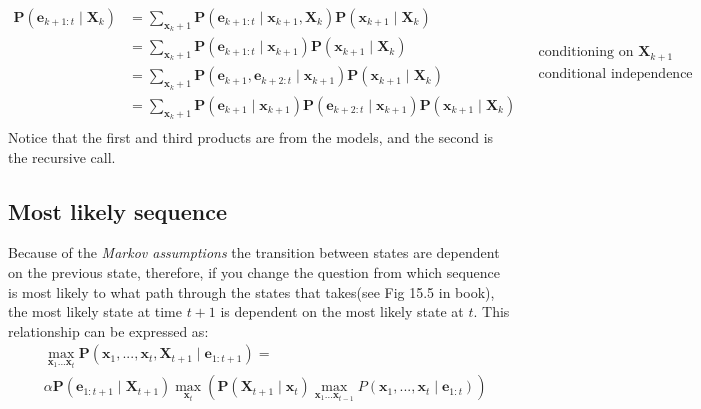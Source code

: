 \documentclass[11pt, letterpaper]{report}
\numberwithin{equation}{section}
\begin{document}
\begin{equation}
  \label{eq:backward}
  \begin{split}
    \boldsymbol{P}(\boldsymbol{e}_{k+1:t} \mid \boldsymbol{X}_k) &=
    \sum_{\boldsymbol{x}_k+1} \boldsymbol{P}(\boldsymbol{e}_{k+1:t} \mid \boldsymbol{x}_{k+1},\boldsymbol{X}_{k})
    \boldsymbol{P}(\boldsymbol{x}_{k+1} \mid \boldsymbol{X}_{k}) \\
    &= \sum_{\boldsymbol{x}_k+1} \boldsymbol{P}(\boldsymbol{e}_{k+1:t} \mid \boldsymbol{x}_{k+1})
    \boldsymbol{P}(\boldsymbol{x}_{k+1} \mid \boldsymbol{X}_{k}) \\
    &= \sum_{\boldsymbol{x}_k+1} \boldsymbol{P}(\boldsymbol{e}_{k+1},\boldsymbol{e}_{k+2:t} \mid
    \boldsymbol{x}_{k+1}) \boldsymbol{P}(\boldsymbol{x}_{k+1} \mid \boldsymbol{X}_{k}) \\
    &= \sum_{\boldsymbol{x}_k+1} \boldsymbol{P}(\boldsymbol{e}_{k+1} \mid
    \boldsymbol{x}_{k+1}) \boldsymbol{P}(\boldsymbol{e}_{k+2:t} \mid
    \boldsymbol{x}_{k+1}) \boldsymbol{P}(\boldsymbol{x}_{k+1} \mid \boldsymbol{X}_{k}) \\
  \end{split}
  \begin{split}
    &\text{conditioning on $\boldsymbol{X}_{k+1}$}\\
    &\text{conditional independence} \\
  \end{split}
\end{equation}
Notice that the first and third products are from the models, and the second is
the recursive call.

\subsection*{Most likely sequence}
Because of the \emph{Markov assumptions} the transition between states are
dependent on the previous state, therefore, if you change the question from
which sequence is most likely to what path through the states that takes(see Fig
15.5 in book), the most likely state at time $t+1$ is dependent on the most
likely state at $t$. This relationship can be expressed as:
\begin{equation}
  \label{eq:mostlikely}
  \begin{split}
  &\max_{\boldsymbol{x}_1...\boldsymbol{x}_t} \boldsymbol{P}(\boldsymbol{x}_1,...,\boldsymbol{x}_t,\boldsymbol{X}_{t+1}
  \mid \boldsymbol{e}_{1:t+1}) = \\
  &\alpha \boldsymbol{P}(\boldsymbol{e}_{1:t+1} \mid \boldsymbol{X}_{t+1}) \max_{\boldsymbol{x}_t}
  (\boldsymbol{P}(\boldsymbol{X}_{t+1} \mid \boldsymbol{x}_t)
  \max_{\boldsymbol{x}_1...\boldsymbol{x}_{t-1}} P(\boldsymbol{x}_1,...,\boldsymbol{x}_{t} \mid \boldsymbol{e}_{1:t}) ) \\
  \end{split}
\end{equation}
\end{document}
